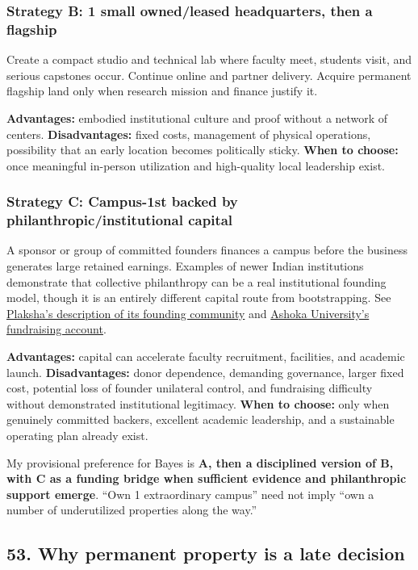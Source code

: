 \subsubsection*{Strategy B: 1 small owned/\allowbreak leased headquarters, then a flagship}

Create a compact studio and technical lab where faculty meet, students visit, and serious capstones occur. Continue online and partner delivery. Acquire permanent flagship land only when research mission and finance justify it.

\textbf{Advantages:} embodied institutional culture and proof without a network of centers.
\textbf{Disadvantages:} fixed costs, management of physical operations, possibility that an early location becomes politically sticky.
\textbf{When to choose:} once meaningful in-person utilization and high-quality local leadership exist.

\subsubsection*{Strategy C: Campus-1st backed by philanthropic/\allowbreak institutional capital}

A sponsor or group of committed founders finances a campus before the business generates large retained earnings. Examples of newer Indian institutions demonstrate that collective philanthropy can be a real institutional founding model, though it is an entirely different capital route from bootstrapping. See \href{https://plaksha.edu.in/\allowbreak about-us}{Plaksha's description of its founding community} and \href{https://giving.ashoka.edu.in/}{Ashoka University's fundraising account}.

\textbf{Advantages:} capital can accelerate faculty recruitment, facilities, and academic launch.
\textbf{Disadvantages:} donor dependence, demanding governance, larger fixed cost, potential loss of founder unilateral control, and fundraising difficulty without demonstrated institutional legitimacy.
\textbf{When to choose:} only when genuinely committed backers, excellent academic leadership, and a sustainable operating plan already exist.

My provisional preference for Bayes is \textbf{A, then a disciplined version of B, with C as a funding bridge when sufficient evidence and philanthropic support emerge}. ``Own 1 extraordinary campus'' need not imply ``own a number of underutilized properties along the way.''

\subsection{53. Why permanent property is a late decision}

